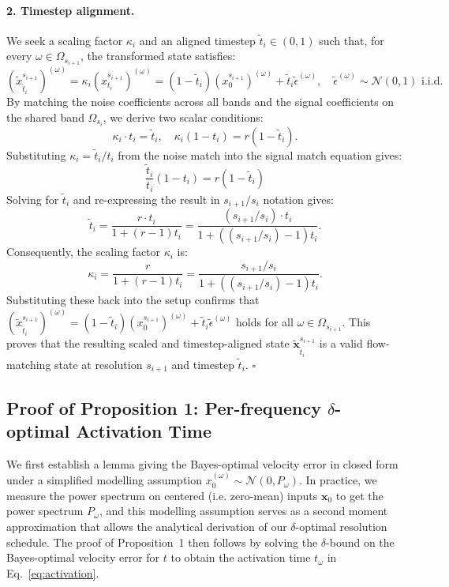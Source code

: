\paragraph{2. Timestep alignment.}
We seek a scaling factor $\kappa_i$ and an aligned timestep $\tilde{t}_i \in (0, 1)$ such that, for every $\omega \in \Omega_{s_{i+1}}$, the transformed state satisfies:
$$
\left(\tilde{x}^{s_{i+1}}_{\tilde{t}_i}\right)^{(\omega)} = \kappa_i\left(x^{s_{i+1}}_{t_i}\right)^{(\omega)} = (1-\tilde{t}_i)\left(x_{0}^{s_{i+1}}\right)^{(\omega)} + \tilde{t}_i\tilde\epsilon^{(\omega)}, \quad \tilde\epsilon^{(\omega)} \sim \mathcal{N}(0,1) \text{ i.i.d.}
$$
By matching the noise coefficients across all bands and the signal coefficients on the shared band $\Omega_{s_i}$, we derive two scalar conditions:
$$
\kappa_i \cdot t_i = \tilde{t}_i, \quad \kappa_i(1-t_i) = r(1-\tilde{t}_i).
$$
Substituting $\kappa_i = \tilde{t}_i/t_i$ from the noise match into the signal match equation gives:
$$
\frac{\tilde{t}_i}{t_i}(1-t_i) = r(1-\tilde{t}_i)
$$
Solving for $\tilde{t}_i$ and re-expressing the result in $s_{i+1}/s_i$ notation gives:
$$
\tilde{t}_i = \frac{r \cdot t_i}{1 + (r - 1)t_i} = \frac{(s_{i+1}/s_i) \cdot t_i}{1 + ((s_{i+1}/s_i) - 1)t_i}.
$$
Consequently, the scaling factor $\kappa_i$ is:
$$
\kappa_i = \frac{r}{1 + (r - 1)t_i} = \frac{s_{i+1}/s_i}{1 + ((s_{i+1}/s_i) - 1)t_i}.
$$
Substituting these back into the setup confirms that $\left(\tilde{x}^{s_{i+1}}_{\tilde{t}_i}\right)^{(\omega)} = (1-\tilde{t}_i)\left(x_{0}^{s_{i+1}}\right)^{(\omega)} + \tilde{t}_i\tilde\epsilon^{(\omega)}$ holds for all $\omega \in \Omega_{s_{i+1}}$. This proves that the resulting scaled and timestep-aligned state $\tilde{\mathbf{x}}^{s_{i+1}}_{\tilde{t}_i}$ is a valid flow-matching state at resolution $s_{i+1}$ and timestep $\tilde{t}_i$. $\square$

\subsection{Proof of Proposition 1: Per-frequency $\delta$-optimal Activation Time}
\label{app:proof-prop1}

We first establish a lemma giving the Bayes-optimal velocity error in closed form under a simplified modelling assumption $x_0^{(\omega)} \sim \mathcal{N}(0, P_\omega)$. In practice, we measure the power spectrum on centered (i.e. zero-mean) inputs $\mathbf{x}_0$ to get the power spectrum $P_\omega$, and this modelling assumption serves as a second moment approximation that allows the analytical derivation of our $\delta$-optimal resolution schedule. The proof of Proposition~1 then follows by solving the $\delta$-bound on the Bayes-optimal velocity error for $t$ to obtain the activation time $t_\omega$ in Eq.~\eqref{eq:activation}.

